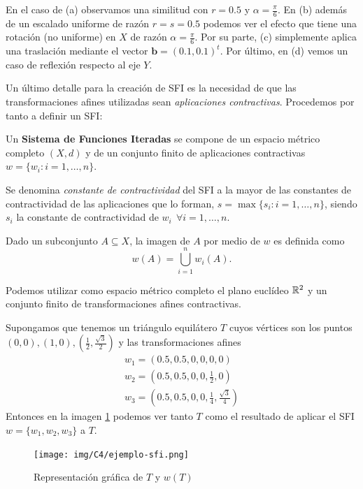 En el caso de (a) observamos una similitud con $r=0.5$ y $\alpha=\frac{\pi}{6}$. En (b) además de un escalado uniforme de razón $r=s=0.5$ podemos ver el efecto que tiene una rotación (no uniforme) en $X$ de razón $\alpha=\frac{\pi}{6}$. Por su parte, (c) simplemente aplica una traslación mediante el vector $\mathbf b=(0.1,0.1)^t$. Por último, en (d) vemos un caso de reflexión respecto al eje $Y$.

Un último detalle para la creación de SFI es la necesidad de que las transformaciones afines utilizadas sean \textit{aplicaciones contractivas}. Procedemos por tanto a definir un SFI:

\begin{definicion}
    \label{def:SFI}
    Un \textbf{Sistema de Funciones Iteradas} se compone de un espacio métrico completo $(X,d)$ y de un conjunto finito de aplicaciones contractivas $w=\{w_i:i=1,\dots,n\}$.

    Se denomina \textit{constante de contractividad} del SFI a la mayor de las constantes de contractividad de las aplicaciones que lo forman, $s=\max\{s_i:i=1,\dots,n\}$, siendo $s_i$ la constante de contractividad de $w_i \ \ \forall i=1,\dots,n$.

    Dado un subconjunto $A\subseteq X$, la imagen de $A$ por medio de $w$ es definida como
    $$
    w(A)=\bigcup_{i=1}^n w_i(A).
    $$
\end{definicion}

Podemos utilizar como espacio métrico completo el plano euclídeo $\mathbb{R}^2$ y un conjunto finito de transformaciones afines contractivas.

\begin{ejemplo}
    \label{ejemplo:sfi}
    Supongamos que tenemos un triángulo equilátero $T$ cuyos vértices son los puntos $(0,0),(1,0),(\frac{1}{2},\frac{\sqrt{3}}{2})$ y las transformaciones afines
    \begin{eqnarray*}
        w_1 = \left(0.5,0.5,0,0,0,0\right) \\
        w_2 = \left(0.5,0.5,0,0,\frac 1 2,0\right) \\
        w_3 = \left(0.5,0.5,0,0,\frac 1 4,\frac{\sqrt{3}}{4}\right)
    \end{eqnarray*}
    Entonces en la imagen \ref{fig:ejemplo-sfi} podemos ver tanto $T$ como el resultado de aplicar el SFI \linebreak $w=\{w_1,w_2,w_3\}$ a $T$.
    \begin{figure} [ht]
    \centering
    \texttt{[image: img/C4/ejemplo-sfi.png]}
    \caption{Representación gráfica de $T$ y $w(T)$}
        \label{fig:ejemplo-sfi}
    \end{figure}
\end{ejemplo}

